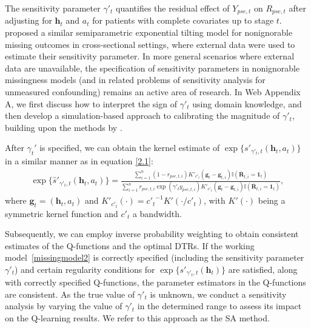 \documentclass[12pt]{article}
\begin{document}


The sensitivity parameter $\gamma'_t$ quantifies the residual effect of $Y_{pse,t}$ on $R_{pse,t}$ after adjusting for $\bm{h}_t$ and $a_t$ for patients with complete covariates up to stage $t$. \cite{Kim_Yu_2011} proposed a similar semiparametric exponential tilting model for nonignorable missing outcomes in cross-sectional settings, where external data were used to estimate their sensitivity parameter. In more general scenarios where external data are unavailable, the specification of sensitivity parameters in  nonignorable missingness models (and  in related problems of sensitivity analysis for unmeasured confounding) remains an active  area of research. In Web Appendix A, we first discuss how to interpret the sign of $\gamma'_t$ using domain knowledge, and then develop a simulation-based approach to calibrating the magnitude of  $\gamma'_t$, building upon the methods by \cite{yin2019simulation}.

After $\gamma_t'$ is specified, we can obtain the kernel estimate of $\exp\{s'_{\gamma'_t,t}(\bm{h}_t,a_t)\}$ in a similar manner as in equation \eqref{2.1}:
\begin{align}
    \exp\{\widehat{s}'_{\gamma'_t,t}(\bm{h}_t,a_t) \} =  \frac{\sum_{i=1}^{n} \left(1-r_{pse,t,i}\right)  K'_{c'_t}\left(\bm{g}_t-\bm{g}_{t,i}\right) \mathbb{I}(\overline{\bm{R}}_{t,i}=\bm{1}_t) }{\sum_{i=1}^{n}  r_{pse,t,i}   \exp \left(\gamma'_t y_{pse,t,i}\right) K'_{c'_t}\left(\bm{g}_t-\bm{g}_{t,i}\right) \mathbb{I} (\overline{\bm{R}}_{t,i}=\bm{1}_t)}, \label{2.3} %
\end{align}
where $\bm{g}_t = (\bm{h}_t,a_t)$ and $K'_{c'_t}(\cdot) = {c'_t}^{-1}K'(\cdot/c'_t)$, with $K'(\cdot)$ being a symmetric kernel function and $c'_t$ a bandwidth.

Subsequently, we can employ inverse probability weighting  to obtain consistent estimates of the Q-functions and the optimal DTRs. If the working model~\eqref{missingmodel2} is correctly specified (including the sensitivity parameter $\gamma'_t$)  and certain regularity conditions for $\exp\{s'_{\gamma'_t,t}(\bm{h}_t)\}$ are satisfied, along with correctly specified Q-functions, the parameter estimators in the Q-functions are consistent. As the true value of  $\gamma'_t$ is unknown, we conduct a sensitivity analysis by varying the value of  $\gamma'_t$ in the determined range to assess its  impact  on the Q-learning results. %
 We refer to this approach as the SA method.
\end{document}
